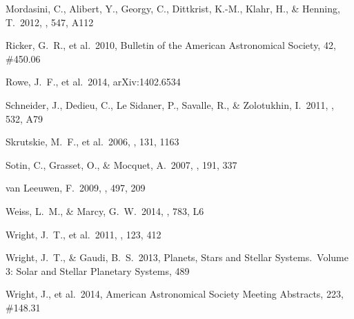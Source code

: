 \begin{thebibliography}
 Mordasini, C., Alibert, Y., 
Georgy, C., Dittkrist, K.-M., Klahr, H., \& Henning, T.\ 2012, \aap, 547, A112

 Ricker, G.~R., et al.\ 2010, 
Bulletin of the American Astronomical Society, 42, \#450.06 %

 Rowe, J.~F., et al.\ 2014, 
arXiv:1402.6534 %

 Schneider, J., Dedieu, C., 
Le Sidaner, P., Savalle, R., \& Zolotukhin, I.\ 2011, \aap, 532, A79

 Skrutskie, M.~F., et al.\ 
2006, \aj, 131, 1163 %

 Sotin, C., Grasset, O., 
\& Mocquet, A.\ 2007, \icarus, 191, 337 %

 van Leeuwen, F.\ 2009, \aap, 
497, 209 %

 Weiss, L.~M., \& Marcy,
  G.~W.\ 2014, \apjl, 783, L6  %

 Wright, J.~T., et al.\ 2011,
  \pasp, 123, 412 %

 Wright, J.~T., \& Gaudi, B.~S.\ 2013,
  Planets, Stars and Stellar Systems.~Volume 3: Solar and Stellar
  Planetary Systems, 489 %

 Wright, J., et al.\ 2014, 
American Astronomical Society Meeting Abstracts, 223, \#148.31

\end{thebibliography}
